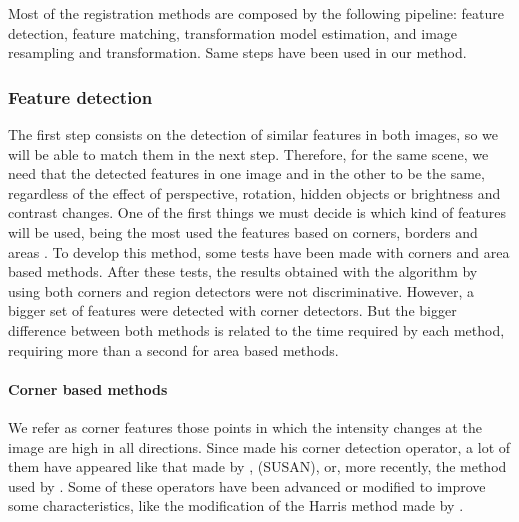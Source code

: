 Most of the registration methods are composed by the following pipeline: feature detection, feature matching, transformation model estimation, and image resampling and transformation. Same steps have been used in our method.

\subsubsection{Feature detection}\label{ch:chapter01_01_02_01}

The first step consists on the detection of similar features in both images, so we will be able to match them in the next step. Therefore, for the same scene, we need that the detected features in one image and in the other to be the same, regardless of the effect of perspective, rotation, hidden objects or brightness and contrast changes. One of the first things we must decide is which kind of features will be used, being the most used the features based on corners, borders and areas \citep{li2008comprehensive}. To develop this method, some tests have been made with corners and area based methods. After these tests, the results obtained with the algorithm by using both corners and region detectors were not discriminative. However, a bigger set of features were detected with corner detectors. But the bigger difference between both methods is related to the time required by each method, requiring more than a second for area based methods.

\paragraph{Corner based methods}\label{ch:chapter01_01_02_01_01}

We refer as corner features those points in which the intensity changes at the image are high in all directions. Since \cite{hans1977towards} made his corner detection operator, a lot of them have appeared like that made by \cite{harris1988combined}, \cite{smith1997susan} (SUSAN), or, more recently, the method used by \cite{rosten2006machine}. Some of these operators have been advanced or modified to improve some characteristics, like the modification of the Harris method made by \cite{shi1994good}.

